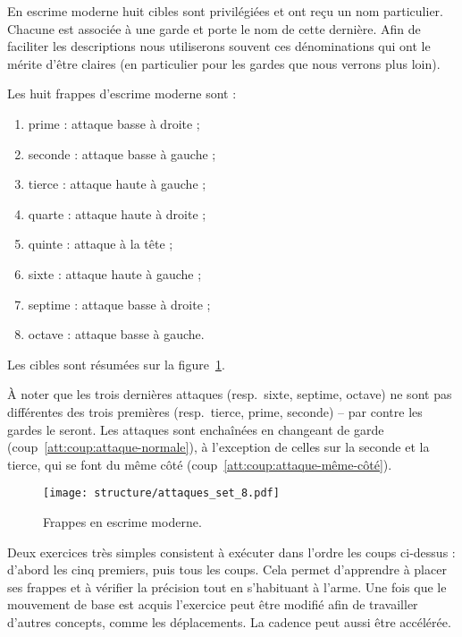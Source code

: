 En escrime moderne huit cibles sont privilégiées et ont reçu un nom particulier.
Chacune est associée à une garde et porte le nom de cette dernière.
Afin de faciliter les descriptions nous utiliserons souvent ces dénominations qui ont le mérite d'être claires (en particulier pour les gardes que nous verrons plus loin).


\begin{coup}
\label{att:coup:série-8}

\noindent
Les huit frappes d'escrime moderne sont :
\begin{enumerate}
	\item prime : attaque basse à droite ;
	\item seconde : attaque basse à gauche ;
	\item tierce : attaque haute à gauche ;
	\item quarte : attaque haute à droite ;
	\item quinte : attaque à la tête ;
	\item sixte : attaque haute à gauche ;
	\item septime : attaque basse à droite ;
	\item octave : attaque basse à gauche.
\end{enumerate}

Les cibles sont résumées sur la figure~\ref{att:fig:série-8}.
\end{coup}


À noter que les trois dernières attaques (resp.\ sixte, septime, octave) ne sont pas différentes des trois premières (resp.\ tierce, prime, seconde) -- par contre les gardes le seront.
Les attaques sont enchaînées en changeant de garde (coup~\ref{att:coup:attaque-normale}), à l'exception de celles sur la seconde et la tierce, qui se font du même côté (coup~\ref{att:coup:attaque-même-côté}).


\begin{figure}[ht]
	\centering
	\texttt{[image: structure/attaques\_set\_8.pdf]}
	\caption{Frappes en escrime moderne.}
	\label{att:fig:série-8}
\end{figure}


Deux exercices très simples consistent à exécuter dans l'ordre les coups ci-dessus : d'abord les cinq premiers, puis tous les coups.
Cela permet d'apprendre à placer ses frappes et à vérifier la précision tout en s'habituant à l'arme.
Une fois que le mouvement de base est acquis l'exercice peut être modifié afin de travailler d'autres concepts, comme les déplacements.
La cadence peut aussi être accélérée.


